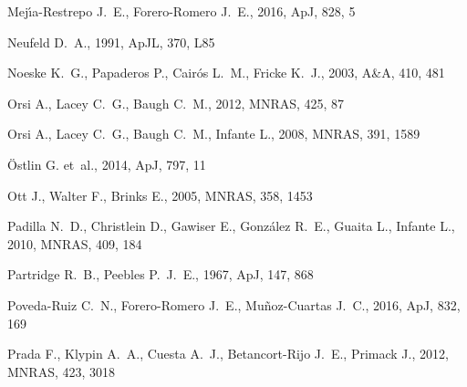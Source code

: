 \documentclass[a4,useAMS,usenatbib,usegraphicx]{mn2e}
\newcommand{\apj}{ApJ}
\newcommand{\apjl}{ApJL}
\newcommand{\mnras}{MNRAS}
\newcommand{\aap}{A\&A}
\begin{document}
\begin{thebibliography}{}
{Mej{\'{\i}}a-Restrepo} J.~E.,  {Forero-Romero} J.~E.,  2016, \apj, 828, 5

{Neufeld} D.~A.,  1991, \apjl, 370, L85

{Noeske} K.~G.,  {Papaderos} P.,  {Cair{\'o}s} L.~M.,    {Fricke} K.~J.,  2003,
  \aap, 410, 481

{Orsi} A.,  {Lacey} C.~G.,    {Baugh} C.~M.,  2012, \mnras, 425, 87

{Orsi} A.,  {Lacey} C.~G.,  {Baugh} C.~M.,    {Infante} L.,  2008, \mnras, 391,
  1589

{{\"O}stlin} G.  et~al., 2014, \apj, 797, 11

{Ott} J.,  {Walter} F.,    {Brinks} E.,  2005, \mnras, 358, 1453

{Padilla} N.~D.,  {Christlein} D.,  {Gawiser} E.,  {Gonz{\'a}lez} R.~E.,
  {Guaita} L.,    {Infante} L.,  2010, \mnras, 409, 184

{Partridge} R.~B.,  {Peebles} P.~J.~E.,  1967, \apj, 147, 868

{Poveda-Ruiz} C.~N.,  {Forero-Romero} J.~E.,    {Mu{\~n}oz-Cuartas} J.~C.,
  2016, \apj, 832, 169

{Prada} F.,  {Klypin} A.~A.,  {Cuesta} A.~J.,  {Betancort-Rijo} J.~E.,
  {Primack} J.,  2012, \mnras, 423, 3018


\end{thebibliography}
\end{document}
